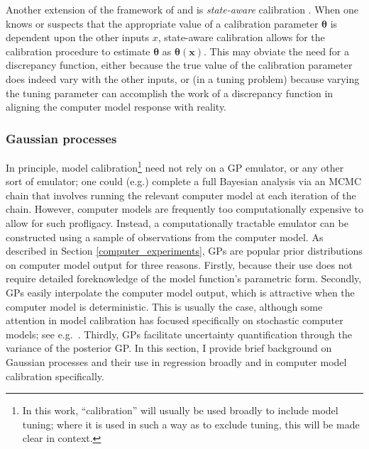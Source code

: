 \documentclass{article}
\begin{document}
Another extension of the framework of \cite{Kennedy2001} and \cite{Bayarri2007} is \emph{state-aware} calibration \citep{Atamturktur2015,Stevens2018,Brown2016}. When one knows or suspects that the appropriate value of a calibration parameter $\boldsymbol \theta$ is dependent upon the other inputs $x$, state-aware calibration allows for the calibration procedure to estimate $\boldsymbol \theta$ as $\boldsymbol \theta(\mathbf x)$. This may obviate the need for a discrepancy function, either because the true value of the calibration parameter does indeed vary with the other inputs, or (in a tuning problem) because varying the tuning parameter can accomplish the work of a discrepancy function in aligning the computer model response with reality.

\subsubsection{Gaussian processes} \label{gaussian_processes}

In principle, model calibration\footnote{In this work, ``calibration'' will usually be used broadly to include model tuning; where it is used in such a way as to exclude tuning, this will be made clear in context.}
need not rely on a GP emulator, or any other sort of emulator; one could (e.g.) complete a full Bayesian analysis via an MCMC chain that involves running the relevant computer model at each iteration of the chain. However, computer models are frequently too computationally expensive to allow for such profligacy. Instead, a computationally tractable emulator can be constructed using a sample of observations from the computer model. As described in Section \ref{computer_experiments}, GPs are popular prior distributions on computer model output for three reasons. Firstly, because their use does not require detailed foreknowledge of the model function's parametric form. Secondly, GPs easily interpolate the computer model output, which is attractive when the computer model is deterministic. This is usually the case, although some attention in model calibration has focused specifically on stochastic computer models; see e.g.\ \cite{Pratola2018}. Thirdly, GPs facilitate uncertainty quantification through the variance of the posterior GP. In this section, I provide brief background on Gaussian processes and their use in regression broadly and in computer model calibration specifically.

\end{document}
